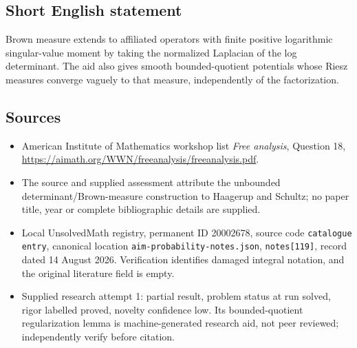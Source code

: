 \documentclass[11pt]{article}
\begin{document}
\subsection{Short English statement}
Brown measure extends to affiliated operators with finite positive logarithmic singular-value moment by taking the normalized Laplacian of the log determinant. The aid also gives smooth bounded-quotient potentials whose Riesz measures converge vaguely to that measure, independently of the factorization.
\subsection{Sources}
\begin{itemize}
\item American Institute of Mathematics workshop list \emph{Free analysis}, Question 18, \url{https://aimath.org/WWN/freeanalysis/freeanalysis.pdf}.
\item The source and supplied assessment attribute the unbounded determinant/Brown-measure construction to Haagerup and Schultz; no paper title, year or complete bibliographic details are supplied.
\item Local UnsolvedMath registry, permanent ID 20002678, source code \texttt{catalogue entry}, canonical location \texttt{aim-probability-notes.json}, \texttt{notes[119]}, record dated 14 August 2026. Verification identifies damaged integral notation, and the original literature field is empty.
\item Supplied research attempt 1: partial result, problem status at run solved, rigor labelled proved, novelty confidence low. Its bounded-quotient regularization lemma is machine-generated research aid, not peer reviewed; independently verify before citation.
\end{itemize}
\end{document}
